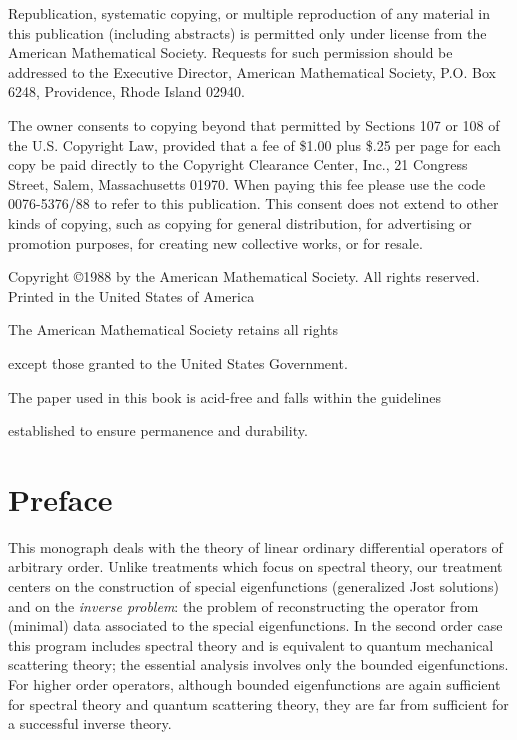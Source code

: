 \documentclass{surv-l}
\theoremstyle{plain}
\theoremstyle{definition}
\numberwithin{equation}{chapter}
\newcommand\circledinfty{\ooalign{$\bigcirc$\cr$\infty$\cr}\space}
\newenvironment{copyrightpage}{\clearpage\null\thispagestyle{empty}}{\thispagestyle{empty}\clearpage}
\begin{document}
\begin{copyrightpage}
Republication, systematic copying, or multiple reproduction of any material in this publication (including abstracts) is permitted only under license from the American Mathematical Society. Requests for such permission should be addressed to the Executive Director, American Mathematical Society, P.O. Box 6248, Providence, Rhode Island 02940.

The owner consents to copying beyond that permitted by Sections 107 or 108 of the U.S. Copyright Law, provided that a fee of {\$}1.00 plus {\$}.25 per page for each copy be paid directly to the Copyright Clearance Center, Inc., 21 Congress Street, Salem, Massachusetts 01970. When paying this fee please use the code 0076-5376/88 to refer to this publication. This consent does not extend to other kinds of copying, such as copying for general distribution, for advertising or promotion purposes, for creating new collective works, or for resale.

\begin{center}
Copyright \copyright 1988 by the American Mathematical Society. All rights reserved. Printed in the United States of America

The American Mathematical Society retains all rights

except those granted to the United States Government.


The paper used in this book is acid-free and falls within the guidelines

established to ensure permanence and durability. \circledinfty
\end{center}
\end{copyrightpage}


\tableofcontents
\frontmatter

\chapter*{Preface}
This monograph deals with the theory of linear ordinary differential operators of arbitrary order. Unlike treatments which focus on spectral theory, our treatment centers on the construction of special eigenfunctions (generalized Jost solutions) and on the \emph{inverse problem}: the problem of reconstructing the operator from (minimal) data associated to the special eigenfunctions. In the second order case this program includes spectral theory and is equivalent to quantum mechanical scattering theory; the essential analysis involves only the bounded eigenfunctions. For higher order operators, although bounded eigenfunctions are again sufficient for spectral theory and quantum scattering theory, they are far from sufficient for a successful inverse theory.
\end{document}
